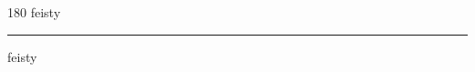 
\begin{frame}
\begin{center}
\begin{turn}{180}
{\fontsize{2.5cm}{1em}\selectfont feisty}
\end{turn}
\vspace{1em}\par  
\hrule
\vspace{1em}\par  
{\fontsize{2.5cm}{1em}\selectfont feisty}
\end{center}
\end{frame}
